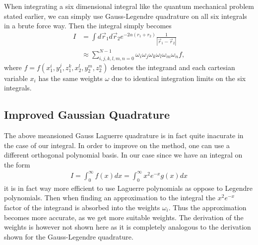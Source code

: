 \documentclass[10pt, twocolumn]{aastex62}
\begin{document}
When integrating a six dimensional integral like the quantum mechanical problem
stated earlier, we can simply use Gauss-Legendre quadrature on all six integrals
in a brute force way. Then the integral simply becomes 
\begin{align}
	I &= \int d\vec{r}_1d\vec{r}_2 e^{-2\alpha(r_1 + r_2)}\frac{1}{|\vec{r}_1 - \vec{r}_2|} \\
	&\approx \sum_{i, j, k, l, m, n = 0}^{N-1} \omega_i \omega_j \omega_k \omega_l \omega_m \omega_n f,
\end{align} 
where $f = f(x_1^i, y_1^j, z_1^k, x_2^l, y_2^m, z_2^n)$ denotes the integrand
and each cartesian variable $x_i$ has the same weights $\omega$ due to identical
integration limits on the six integrals. 

\subsection{Improved Gaussian Quadrature}\label{subsec:improved_gauss}
The above meansioned Gauss Laguerre quadrature is in fact quite inacurate in the
case of our integral. In order to improve on the method, one can use a different
orthogonal polynomial basis. In our case since we have an integral on the form
\begin{align}
	I = \int^\infty_0 f(x)dx = \int^\infty_0x^2e^{-x}g(x) dx
	\label{eq:laguerre_integral}
\end{align}
it is in fact way more efficient to use Laguerre polynomials as oppose to
Legendre polynomials. Then when finding an approximation to the integral the
$x^2e^{-x}$ factor of the integrand is absorbed into the weights $\omega_i$.
Thus the approximation becomes more accurate, as we get more suitable weights.
The derivation of the weights is however not shown here as it is completely
analogous to the derivation shown for the Gauss-Legendre quadrature.
\end{document}
